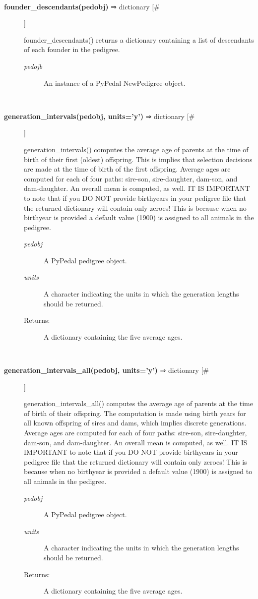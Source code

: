 \documentclass[10pt]{article}
\begin{document}
\begin{description}
\begin{description}
\end{description}
\\ 

\item[\textbf{founder\_descendants(pedobj)}
 ⇒ dictionary [\#]]

 founder\_descendants() returns a dictionary containing a list of descendants of each founder in the pedigree.
\begin{description}
\item[\emph{pedojb}
] An instance of a PyPedal NewPedigree object.

\end{description}
\\ 

\item[\textbf{generation\_intervals(pedobj, units='y')}
 ⇒ dictionary [\#]]

 generation\_intervals() computes the average age of parents at the time of birth of their first (oldest) offspring. This is implies that selection decisions are made at the time of birth of the first offspring. Average ages are computed for each of four paths: sire-son, sire-daughter, dam-son, and dam-daughter. An overall mean is computed, as well. IT IS IMPORTANT to note that if you DO NOT provide birthyears in your pedigree file that the returned dictionary will contain only zeroes! This is because when no birthyear is provided a default value (1900) is assigned to all animals in the pedigree.
\begin{description}
\item[\emph{pedobj}
] A PyPedal pedigree object.
\item[\emph{units}
] A character indicating the units in which the generation lengths should be returned.
\item[Returns:] A dictionary containing the five average ages.

\end{description}
\\ 

\item[\textbf{generation\_intervals\_all(pedobj, units='y')}
 ⇒ dictionary [\#]]

 generation\_intervals\_all() computes the average age of parents at the time of birth of their offspring. The computation is made using birth years for all known offspring of sires and dams, which implies discrete generations. Average ages are computed for each of four paths: sire-son, sire-daughter, dam-son, and dam-daughter. An overall mean is computed, as well. IT IS IMPORTANT to note that if you DO NOT provide birthyears in your pedigree file that the returned dictionary will contain only zeroes! This is because when no birthyear is provided a default value (1900) is assigned to all animals in the pedigree.
\begin{description}
\item[\emph{pedobj}
] A PyPedal pedigree object.
\item[\emph{units}
] A character indicating the units in which the generation lengths should be returned.
\item[Returns:] A dictionary containing the five average ages.


\end{description}
\end{description}
\end{document}
